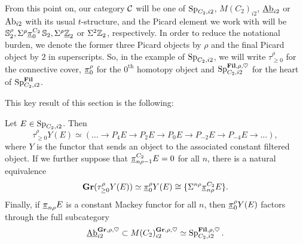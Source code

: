 \begin{cnv}
  From this point on, our category $\mathcal{C}$ will be one of $\operatorname{\mathrm{Sp}}_{C_2, i2}$, $M(C_2)_{i2}$, $\underline{\mathrm{Ab}}_{i2}$ or $\mathrm{Ab}_{i2}$ with its usual $t$-structure, and the Picard element we work with will be $\operatorname{\mathbb{S}}^{\rho} _2, \Sigma^{\rho} \underline{\pi}_{0} ^{C_2} \operatorname{\mathbb{S}}_2, \Sigma^{\rho} \underline{\mathbb{Z}}_{2}$ or $\Sigma^{2} \mathbb{Z}_2$, respectively. In order to reduce the notational burden, we denote the former three Picard objects by $\rho$ and the final Picard object by $2$ in superscripts. So, in the example of $\operatorname{\mathrm{Sp}}_{C_2, i2}$, we will write $\tau_{\geq 0} ^\rho$ for the connective cover, $\underline{\pi}_0 ^\rho$ for the $0^{\mathrm{th}}$ homotopy object and $\operatorname{\mathrm{Sp}}_{C_2, i2} ^{\operatorname{\mathbf{Fil}}, \rho, \heartsuit}$ for the heart of $\operatorname{\mathrm{Sp}}_{C_2, i2} ^{\operatorname{\mathbf{Fil}}}$.
\end{cnv}

This key result of this section is the following:

\begin{lem}\label{prop:twist-slice}
  Let $E \in \operatorname{\mathrm{Sp}}_{C_2, i2}$. Then
  \[\tau_{\geq 0} ^{\rho} Y(E) \simeq \left( \dots \to P_4 E \to P_2 E \to P_0 E \to P_{-2} E \to P_{-4} E \to \dots \right), \]
  where $Y$ is the functor that sends an object to the associated constant filtered object. 
  If we further suppose that $\underline{\pi}_{n\rho-1} ^{C_2} E = 0$ for all $n$, there is a natural equivalence
  \[\operatorname{\mathbf{Gr}} (\tau_{\geq 0} ^{\rho} Y(E)) \simeq \underline{\pi}_0 ^{\rho} Y(E) \cong \{\Sigma^{n\rho} \underline{\pi}_{n\rho} ^{C_2} E\}.\]
  Finally, if $\underline{\pi}_{n\rho} E$ is a constant Mackey functor for all $n$, then
  $ \underline{\pi}_0 ^{\rho} Y(E) $
  factors through the full subcategory
  \[\underline{\mathrm{Ab}}_{i2} ^{\operatorname{\mathbf{Gr}}, \rho, \heartsuit} \subset M(C_2)_{i2} ^{\operatorname{\mathbf{Gr}}, \rho, \heartsuit} \simeq \operatorname{\mathrm{Sp}}_{C_2, i2} ^{\operatorname{\mathbf{Fil}}, \rho, \heartsuit}.\]
\end{lem}

